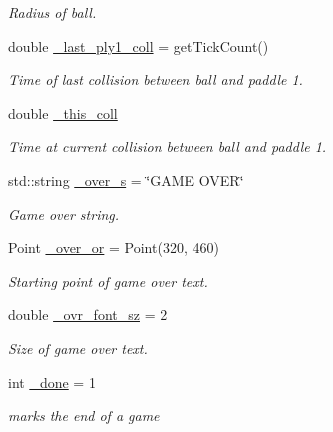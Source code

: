\begin{DoxyCompactItemize}
\begin{DoxyCompactList}\small\item\em Radius of ball. \end{DoxyCompactList}\item 
\hypertarget{class_c_pong_ad142712d4af01ed44b6532ac0811c176}{}\label{class_c_pong_ad142712d4af01ed44b6532ac0811c176} 
double \hyperlink{class_c_pong_ad142712d4af01ed44b6532ac0811c176}{\+\_\+last\+\_\+ply1\+\_\+coll} = get\+Tick\+Count()
\begin{DoxyCompactList}\small\item\em Time of last collision between ball and paddle 1. \end{DoxyCompactList}\item 
\hypertarget{class_c_pong_ae675e98d192cc2c7151be660974925f9}{}\label{class_c_pong_ae675e98d192cc2c7151be660974925f9} 
double \hyperlink{class_c_pong_ae675e98d192cc2c7151be660974925f9}{\+\_\+this\+\_\+coll}
\begin{DoxyCompactList}\small\item\em Time at current collision between ball and paddle 1. \end{DoxyCompactList}\item 
\hypertarget{class_c_pong_a0726f16f893975ce1072167d9d2b7357}{}\label{class_c_pong_a0726f16f893975ce1072167d9d2b7357} 
std\+::string \hyperlink{class_c_pong_a0726f16f893975ce1072167d9d2b7357}{\+\_\+over\+\_\+s} = \char`\"{}G\+A\+ME O\+V\+ER\char`\"{}
\begin{DoxyCompactList}\small\item\em Game over string. \end{DoxyCompactList}\item 
\hypertarget{class_c_pong_a8edaed09bb6dd7380fe3154812d758c0}{}\label{class_c_pong_a8edaed09bb6dd7380fe3154812d758c0} 
Point \hyperlink{class_c_pong_a8edaed09bb6dd7380fe3154812d758c0}{\+\_\+over\+\_\+or} = Point(320, 460)
\begin{DoxyCompactList}\small\item\em Starting point of game over text. \end{DoxyCompactList}\item 
\hypertarget{class_c_pong_a4bd29df3cc13dc4dcbcc5b274c3ada5c}{}\label{class_c_pong_a4bd29df3cc13dc4dcbcc5b274c3ada5c} 
double \hyperlink{class_c_pong_a4bd29df3cc13dc4dcbcc5b274c3ada5c}{\+\_\+ovr\+\_\+font\+\_\+sz} = 2
\begin{DoxyCompactList}\small\item\em Size of game over text. \end{DoxyCompactList}\item 
\hypertarget{class_c_pong_a9de5ccd935a5bccf95c97964dbcf8545}{}\label{class_c_pong_a9de5ccd935a5bccf95c97964dbcf8545} 
int \hyperlink{class_c_pong_a9de5ccd935a5bccf95c97964dbcf8545}{\+\_\+done} = 1
\begin{DoxyCompactList}\small\item\em marks the end of a game \end{DoxyCompactList}\end{DoxyCompactItemize}
